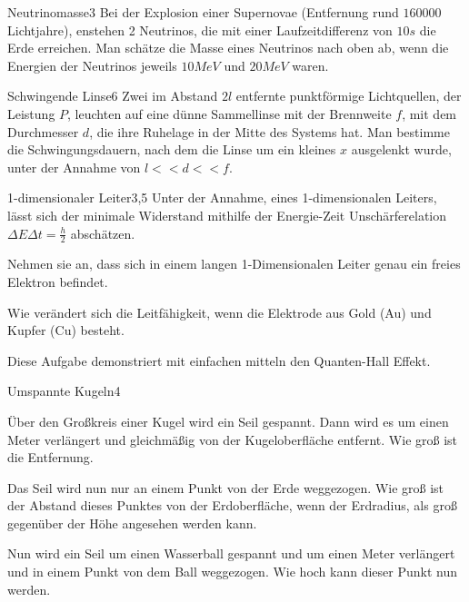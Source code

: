 


\begin{problem}{Neutrinomasse}{3}
Bei der Explosion einer Supernovae (Entfernung rund $160000$ Lichtjahre), enstehen 2 Neutrinos, die mit einer Laufzeitdifferenz von $10\unit{s}$ die Erde erreichen. Man schätze die Masse eines Neutrinos nach oben ab, wenn die Energien der Neutrinos jeweils $10\unit{MeV}$ und $20\unit{MeV}$ waren.
\begin{solution}
\end{solution}
\end{problem}

\begin{problem}{Schwingende Linse}{6}
Zwei im Abstand $2l$ entfernte punktförmige Lichtquellen, der Leistung $P$, leuchten auf eine dünne Sammellinse mit der Brennweite $f$, mit dem Durchmesser $d$, die ihre Ruhelage in der Mitte des Systems hat. Man bestimme die Schwingungsdauern, nach dem die Linse um ein kleines $x$ ausgelenkt wurde, unter der Annahme von $l<<d<<f$.
\end{problem}

\begin{problem}{1-dimensionaler Leiter}{3,5}
Unter der Annahme, eines 1-dimensionalen Leiters, lässt sich der minimale Widerstand mithilfe der Energie-Zeit Unschärferelation $\Delta E\Delta t=\frac h2$ abschätzen.
\begin{abcenum}
 \item Nehmen sie an, dass sich in einem langen 1-Dimensionalen Leiter genau ein freies Elektron befindet.
 \item Wie verändert sich die Leitfähigkeit, wenn die Elektrode aus Gold (Au) und Kupfer (Cu) besteht.
\end{abcenum}
Diese Aufgabe demonstriert mit einfachen mitteln den Quanten-Hall Effekt.
\end{problem}

\begin{problem}{Umspannte Kugeln}{4}
\begin{abcenum}
 \item Über den Großkreis einer Kugel wird ein Seil gespannt. Dann wird es um einen Meter verlängert und gleichmäßig von der Kugeloberfläche entfernt. Wie groß ist die Entfernung.
 \item Das Seil wird nun nur an einem Punkt von der Erde weggezogen. Wie groß ist der Abstand dieses Punktes von der Erdoberfläche, wenn der Erdradius, als groß gegenüber der Höhe angesehen werden kann.
 \item Nun wird ein Seil um einen Wasserball gespannt und um einen Meter verlängert und in einem Punkt von dem Ball weggezogen. Wie hoch kann dieser Punkt nun werden.
\end{abcenum}
\end{problem}

